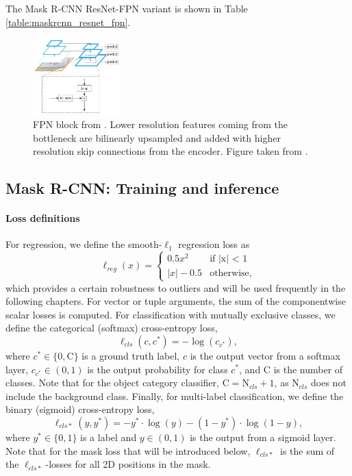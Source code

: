 The Mask R-CNN ResNet-FPN variant is shown in Table \ref{table:maskrcnn_resnet_fpn}.


\begin{figure}[t]
  \centering
  \includegraphics[width=0.3\textwidth]{figures/fpn}
\caption{
FPN block from \cite{FPN}.
Lower resolution features coming from the bottleneck are bilinearly upsampled
and added with higher resolution skip connections from the encoder.
Figure taken from \cite{FPN}.
}
\label{figure:fpn_block}
\end{figure}

\subsection{Mask R-CNN: Training and inference}
\paragraph{Loss definitions}
For regression, we define the smooth-$\ell_1$ regression loss as
\begin{equation}
\ell_{reg}(x) =
\begin{cases}
0.5x^2 &\text{if |x| < 1} \\
|x| - 0.5 &\text{otherwise,}
\end{cases}
\end{equation}
which provides a certain robustness to outliers and will be used
frequently in the following chapters. For vector or tuple arguments, the sum of the componentwise scalar
losses is computed.
For classification with mutually exclusive classes, we define the categorical (softmax) cross-entropy loss,
\begin{equation}
\ell_{cls}(c, c^*) = -\log(c_{c^*}),
\end{equation}
where $c^* \in \{0,\text{C}\}$ is a ground truth label,
$c$ is the output vector from a softmax layer,
$c_{c^*} \in (0,1)$ is the output probability for class $c^*$,
and $\text{C}$ is the number of classes.
Note that for the object category classifier, $\text{C} = \text{N}_{cls} + 1$,
as $\text{N}_{cls}$ does not include the background class.
Finally, for multi-label classification, we define the binary (sigmoid) cross-entropy loss,
\begin{equation}
\ell_{cls*}(y, y^*) = -y^* \cdot \log(y) - (1 - y^*) \cdot \log(1 - y),
\end{equation}
where $y^* \in \{0,1\}$ is a label and $y \in (0,1)$ is the output from a sigmoid layer.
Note that for the mask loss that will be introduced below, $\ell_{cls*}$ is
the sum of the $\ell_{cls*}$-losses for all 2D positions in the mask.

